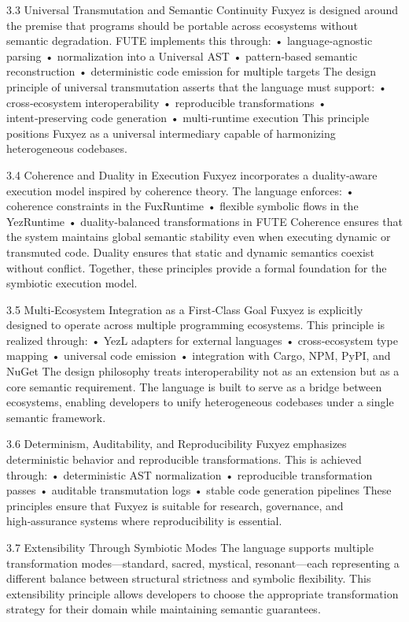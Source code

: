 3.3 Universal Transmutation and Semantic Continuity
Fuxyez is designed around the premise that programs should be portable across ecosystems without semantic degradation. FUTE implements this through:
• 	language‑agnostic parsing
• 	normalization into a Universal AST
• 	pattern‑based semantic reconstruction
• 	deterministic code emission for multiple targets
The design principle of universal transmutation asserts that the language must support:
• 	cross‑ecosystem interoperability
• 	reproducible transformations
• 	intent‑preserving code generation
• 	multi‑runtime execution
This principle positions Fuxyez as a universal intermediary capable of harmonizing heterogeneous codebases.

3.4 Coherence and Duality in Execution
Fuxyez incorporates a duality‑aware execution model inspired by coherence theory. The language enforces:
• 	coherence constraints in the FuxRuntime
• 	flexible symbolic flows in the YezRuntime
• 	duality‑balanced transformations in FUTE
Coherence ensures that the system maintains global semantic stability even when executing dynamic or transmuted code. Duality ensures that static and dynamic semantics coexist without conflict. Together, these principles provide a formal foundation for the symbiotic execution model.

3.5 Multi‑Ecosystem Integration as a First‑Class Goal
Fuxyez is explicitly designed to operate across multiple programming ecosystems. This principle is realized through:
• 	YezL adapters for external languages
• 	cross‑ecosystem type mapping
• 	universal code emission
• 	integration with Cargo, NPM, PyPI, and NuGet
The design philosophy treats interoperability not as an extension but as a core semantic requirement. The language is built to serve as a bridge between ecosystems, enabling developers to unify heterogeneous codebases under a single semantic framework.

3.6 Determinism, Auditability, and Reproducibility
Fuxyez emphasizes deterministic behavior and reproducible transformations. This is achieved through:
• 	deterministic AST normalization
• 	reproducible transformation passes
• 	auditable transmutation logs
• 	stable code generation pipelines
These principles ensure that Fuxyez is suitable for research, governance, and high‑assurance systems where reproducibility is essential.

3.7 Extensibility Through Symbiotic Modes
The language supports multiple transformation modes—standard, sacred, mystical, resonant—each representing a different balance between structural strictness and symbolic flexibility. This extensibility principle allows developers to choose the appropriate transformation strategy for their domain while maintaining semantic guarantees.

